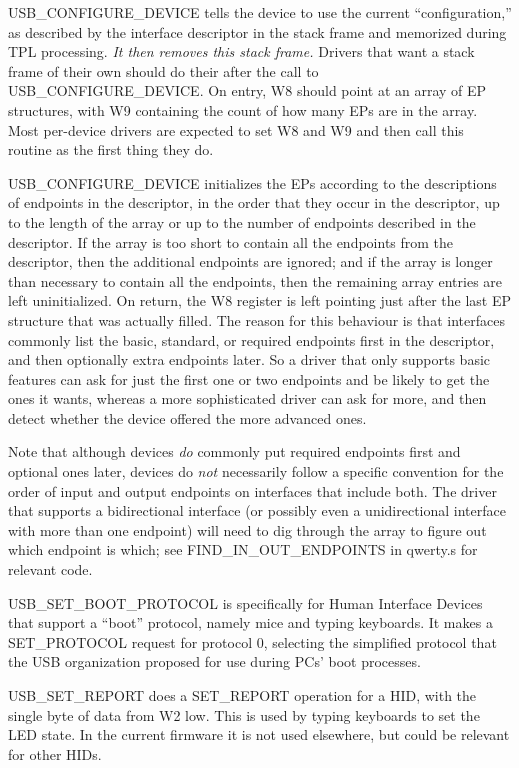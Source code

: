 USB\_CONFIGURE\_DEVICE tells the device to use the current
``configuration,'' as described by the interface descriptor in the
 stack frame and memorized during TPL processing.  \emph{It then
removes this stack frame.} Drivers that want a stack frame of their own
should do their  after the call to USB\_CONFIGURE\_DEVICE.  On
entry, W8 should point at an array of EP structures, with W9 containing the
count of how many EPs are in the array.  Most per-device drivers are
expected to set W8 and W9 and then call this routine as the first thing they
do.

USB\_CONFIGURE\_DEVICE initializes the EPs according to the descriptions of
endpoints in the descriptor, in the order that they occur in the descriptor,
up to the length of the array or up to the number of endpoints described in
the descriptor.  If the array is too short to contain all the endpoints from
the descriptor, then the additional endpoints are ignored; and if the array
is longer than necessary to contain all the endpoints, then the remaining
array entries are left uninitialized.  On return, the W8 register is left
pointing just after the last EP structure that was actually filled.  The
reason for this behaviour is that interfaces commonly list the basic,
standard, or required endpoints first in the descriptor, and then optionally
extra endpoints later.  So a driver that only supports basic features can
ask for just the first one or two endpoints and be likely to get the ones it
wants, whereas a more sophisticated driver can ask for more, and then detect
whether the device offered the more advanced ones.

Note that although devices \emph{do} commonly put required endpoints first
and optional ones later, devices do \emph{not} necessarily follow a specific
convention for the order of input and output endpoints on interfaces that
include both.  The driver that supports a bidirectional interface (or
possibly even a unidirectional interface with more than one endpoint) will
need to dig through the array to figure out which endpoint is which; see
FIND\_IN\_OUT\_ENDPOINTS in qwerty.s for relevant code.

USB\_SET\_BOOT\_PROTOCOL is specifically for Human Interface Devices that
support a ``boot'' protocol, namely mice and typing keyboards.  It makes a
SET\_PROTOCOL request for protocol 0, selecting the simplified protocol that
the USB organization proposed for use during PCs' boot processes.

USB\_SET\_REPORT does a SET\_REPORT operation for a HID, with the single byte
of data from W2 low.  This is used by typing keyboards to set the LED state.
In the current firmware it is not used elsewhere, but could be relevant for
other HIDs.

